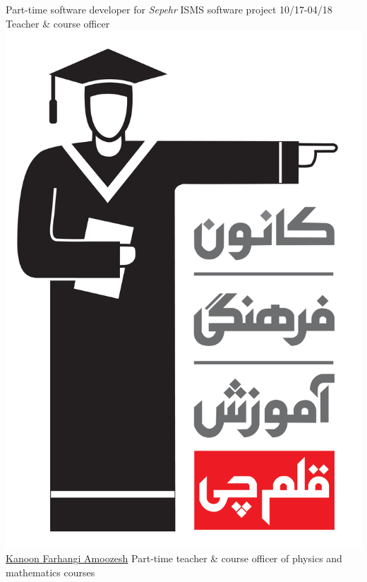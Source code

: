 \documentclass[a4paper]{./classes/friggeri-cv}
\begin{document}
\begin{entrylist}
        {Part-time software developer for \emph{Sepehr} ISMS software project}
        \entry
        {10/17-04/18}
        {    Teacher \& course officer}
        {\href{http://www.kanoon.ir/}{\includegraphics[scale=0.005]{../assets/images/logos/Kanoon_logo.png} Kanoon Farhangi Amoozesh}}
        {Part-time teacher \& course officer of physics and mathematics courses}

\end{entrylist}
\end{document}

